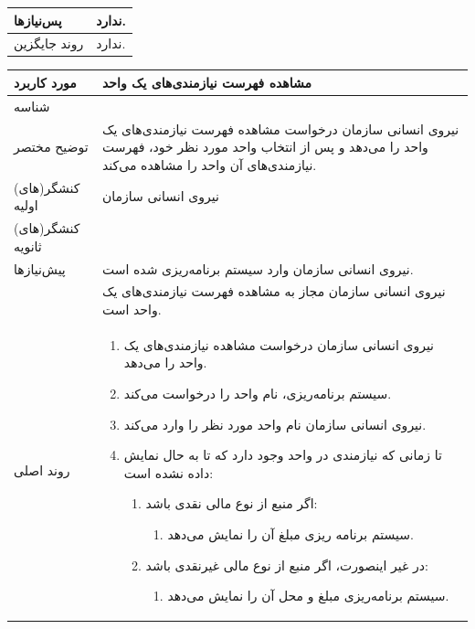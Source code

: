 \begin{table}[H]
\begin{tabular}{|p{3cm}|p{10cm}|}
		\hline
		پس‌نیازها & ندارد. \\
		\hline
		روند جایگزین & ندارد. \\
		\hline
	\end{tabular}
\end{table}


\begin{table}[H]
	\centering
	\begin{tabular}{|p{3cm}|p{10cm}|}
		\hline
		مورد کاربرد & مشاهده فهرست نیازمندی‌های یک واحد  \\
		\hline
		شناسه & 
		\stepcounter{usecase_ID}
		\arabic{usecase_ID} \\
		\hline
		توضیح مختصر & نیروی انسانی سازمان درخواست مشاهده فهرست نیازمندی‌های یک واحد را می‌دهد و پس از انتخاب واحد مورد نظر خود، فهرست نیازمندی‌های آن واحد را مشاهده می‌کند.\\
		\hline
		کنشگر(های) اولیه & نیروی انسانی سازمان \\
		\hline
		کنشگر(های) ثانویه &  \\
		\hline
		پیش‌نیازها & نیروی انسانی سازمان وارد سیستم برنامه‌ریزی شده است. \\
		& نیروی انسانی سازمان مجاز به مشاهده فهرست نیازمندی‌های یک واحد است. \\
		\hline
		
		روند اصلی &
		\begin{enumerate}[topsep=0cm,leftmargin=0.5cm]
			\item نیروی انسانی سازمان درخواست مشاهده نیازمندی‌های یک واحد را می‌دهد.
			\item سیستم برنامه‌ریزی، نام واحد را درخواست می‌کند.
			\item نیروی انسانی سازمان نام واحد مورد نظر را وارد می‌کند.
			\item تا زمانی که نیازمندی در واحد وجود دارد که تا به حال نمایش داده نشده است:
			\begin{enumerate}[topsep=0cm,leftmargin=0.5cm]
				
				\item اگر منبع از نوع مالی نقدی باشد:
				\begin{enumerate}[topsep=0cm,leftmargin=0.5cm]
					\item سیستم برنامه ریزی مبلغ آن را نمایش می‌دهد.
				\end{enumerate}
				\item در غیر اینصورت، اگر منبع از نوع مالی غیرنقدی باشد:
				\begin{enumerate}[topsep=0cm,leftmargin=0.5cm]
					\item سیستم برنامه‌ریزی مبلغ و محل آن را نمایش می‌دهد.
				\end{enumerate}
				

\end{enumerate}
\end{enumerate}
\end{tabular}
\end{table}

